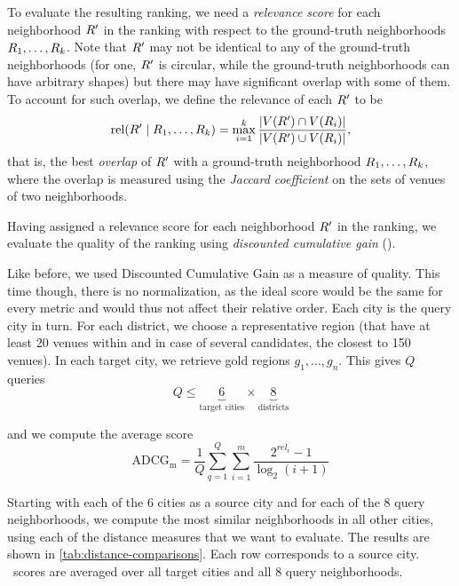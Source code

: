 To evaluate the resulting ranking, we need a 
\emph{relevance score} for each neighborhood ${R}'$ in the ranking
with respect to the ground-truth neighborhoods
${R}_1,\ldots,{R}_k$. 
Note that ${R}'$ may not be identical to any of the ground-truth
neighbor\-hoods (for one, ${R}'$ is circular, while the ground-truth
neighbor\-hoods can have arbitrary shapes) but there may have
significant overlap with some of them. 
To account for such overlap, we define the relevance of each
${R}'$ to be
\[
{\mathrm{rel}}({R}' \mid {R}_1,\ldots,{R}_k) =
\max_{i=1}^{k}
\frac{|{V}({R}')\cap{V}({R}_i)|} {|{V}({R}')\cup{V}({R}_i)|},
\]
that is, the best \emph{overlap} of ${R}'$ with a 
ground-truth neighborhood ${R}_1,\ldots,{R}_k$, 
where the overlap is measured using the \emph{Jaccard coefficient} 
on the sets of venues of two neighborhoods.

Having assigned a relevance score for each neighborhood ${R}'$ in
the ranking, we evaluate the quality of the ranking using 
\emph{discounted cumulative gain} (\dcg).


Like before, we used Discounted Cumulative Gain as a measure of quality. This
time though, there is no normalization, as the ideal score would be the same
for every metric and would thus not affect their relative order. Each city is
the query city in turn. For each district, we choose a representative region
(that have at least 20 venues within and in case of several candidates, the
closest to 150 venues). In each target city, we retrieve gold regions $g_1,
\ldots, g_n$.
This gives $Q$ queries \[
	Q \leq \underbrace{6}_{\text{target cities}} \times
	\underbrace{8}_{\text{districts}} \]

and we compute the average score \[
\mathrm{ADCG_{m}} = \frac{1}{Q}\sum_{q=1}^Q \sum_{i=1}^m \frac{ 2^{rel_{i}} - 1 }{\log_{2}(i+1)}
\]

Starting with each of the 6 cities as a source city and for each of
the 8 query neighborhoods,  
we compute the most similar neighborhoods in all other cities, 
using each of the distance measures that we want to evaluate.  
The results are shown in \autoref{tab:distance-comparisons}. 
Each row corresponds to a source city. 
\dcg\ scores are averaged over all target cities and all 8 query
neighborhoods.


